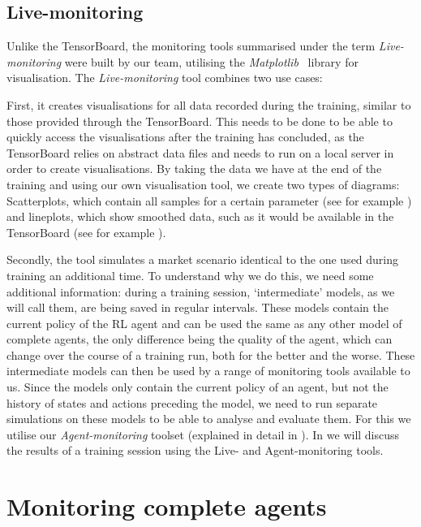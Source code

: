 \subsection{Live-monitoring}\label{subsec:LiveMonitoring}

Unlike the TensorBoard, the monitoring tools summarised under the term \emph{Live-monitoring} were built by our team, utilising the \emph{Matplotlib}~\cite{Matplotlib} library for visualisation. The \emph{Live-monitoring} tool combines two use cases:

First, it creates visualisations for all data recorded during the training, similar to those provided through the TensorBoard. This needs to be done to be able to quickly access the visualisations after the training has concluded, as the TensorBoard relies on abstract data files and needs to run on a local server in order to create visualisations. By taking the data we have at the end of the training and using our own visualisation tool, we create two types of diagrams: Scatterplots, which contain all samples for a certain parameter (see for example ) and lineplots, which show smoothed data, such as it would be available in the TensorBoard (see for example ).

Secondly, the tool simulates a market scenario identical to the one used during training an additional time. To understand why we do this, we need some additional information: during a training session, `intermediate' models, as we will call them, are being saved in regular intervals. These models contain the current policy of the RL agent and can be used the same as any other model of complete agents, the only difference being the quality of the agent, which can change over the course of a training run, both for the better and the worse. These intermediate models can then be used by a range of monitoring tools available to us. Since the models only contain the current policy of an agent, but not the history of states and actions preceding the model, we need to run separate simulations on these models to be able to analyse and evaluate them. For this we utilise our \emph{Agent-monitoring} toolset (explained in detail in ). In  we will discuss the results of a training session using the Live- and Agent-monitoring tools.

\section{Monitoring complete agents}\label{sec:CompleteAgents}

